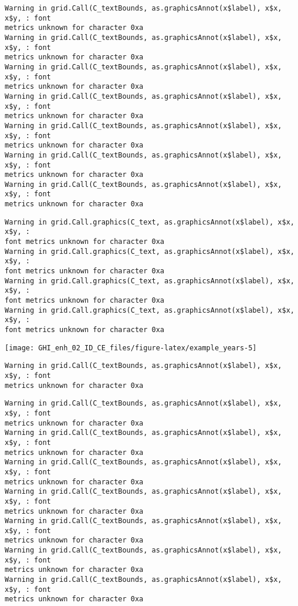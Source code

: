 \documentclass[
  10pt,
  a4paper,oneside]{article}
\begin{document}
\begin{verbatim}
Warning in grid.Call(C_textBounds, as.graphicsAnnot(x$label), x$x, x$y, : font
metrics unknown for character 0xa
Warning in grid.Call(C_textBounds, as.graphicsAnnot(x$label), x$x, x$y, : font
metrics unknown for character 0xa
Warning in grid.Call(C_textBounds, as.graphicsAnnot(x$label), x$x, x$y, : font
metrics unknown for character 0xa
Warning in grid.Call(C_textBounds, as.graphicsAnnot(x$label), x$x, x$y, : font
metrics unknown for character 0xa
Warning in grid.Call(C_textBounds, as.graphicsAnnot(x$label), x$x, x$y, : font
metrics unknown for character 0xa
Warning in grid.Call(C_textBounds, as.graphicsAnnot(x$label), x$x, x$y, : font
metrics unknown for character 0xa
Warning in grid.Call(C_textBounds, as.graphicsAnnot(x$label), x$x, x$y, : font
metrics unknown for character 0xa
\end{verbatim}

\begin{verbatim}
Warning in grid.Call.graphics(C_text, as.graphicsAnnot(x$label), x$x, x$y, :
font metrics unknown for character 0xa
Warning in grid.Call.graphics(C_text, as.graphicsAnnot(x$label), x$x, x$y, :
font metrics unknown for character 0xa
Warning in grid.Call.graphics(C_text, as.graphicsAnnot(x$label), x$x, x$y, :
font metrics unknown for character 0xa
Warning in grid.Call.graphics(C_text, as.graphicsAnnot(x$label), x$x, x$y, :
font metrics unknown for character 0xa
\end{verbatim}

\begin{center}\texttt{[image: GHI\_enh\_02\_ID\_CE\_files/figure-latex/example\_years-5]} \end{center}

\begin{verbatim}
Warning in grid.Call(C_textBounds, as.graphicsAnnot(x$label), x$x, x$y, : font
metrics unknown for character 0xa
\end{verbatim}

\begin{verbatim}
Warning in grid.Call(C_textBounds, as.graphicsAnnot(x$label), x$x, x$y, : font
metrics unknown for character 0xa
Warning in grid.Call(C_textBounds, as.graphicsAnnot(x$label), x$x, x$y, : font
metrics unknown for character 0xa
Warning in grid.Call(C_textBounds, as.graphicsAnnot(x$label), x$x, x$y, : font
metrics unknown for character 0xa
Warning in grid.Call(C_textBounds, as.graphicsAnnot(x$label), x$x, x$y, : font
metrics unknown for character 0xa
Warning in grid.Call(C_textBounds, as.graphicsAnnot(x$label), x$x, x$y, : font
metrics unknown for character 0xa
Warning in grid.Call(C_textBounds, as.graphicsAnnot(x$label), x$x, x$y, : font
metrics unknown for character 0xa
Warning in grid.Call(C_textBounds, as.graphicsAnnot(x$label), x$x, x$y, : font
metrics unknown for character 0xa
\end{verbatim}
\end{document}
